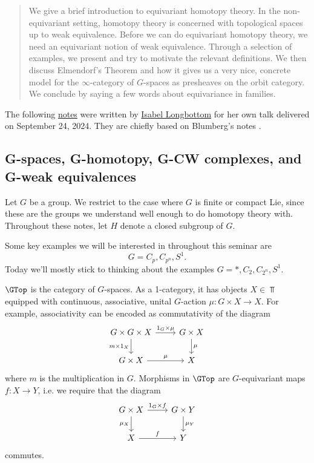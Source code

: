 \begin{abstract}
    We give a brief introduction to equivariant homotopy theory. In the non-equivariant setting, homotopy theory is concerned with topological spaces up to weak equivalence. Before we can do equivariant homotopy theory, we need an equivariant notion of weak equivalence. Through a selection of examples, we present and try to motivate the relevant definitions. We then discuss Elmendorf's Theorem and how it gives us a very nice, concrete model for the $\infty$-category of $G$-spaces as presheaves on the orbit category. We conclude by saying a few words about equivariance in families.
\end{abstract}

The following \href{https://isabel-prime.github.io/files/eqvt-talk.pdf}{notes} were written by \href{https://isabel-prime.github.io/}{Isabel Longbottom} for her own talk delivered on September 24, 2024.
They are chiefly based on Blumberg's notes \cite{burnside}.

\subsection{G-spaces, G-homotopy, G-CW complexes, and G-weak equivalences}

Let $G$ be a group. We restrict to the case where $G$ is finite or compact Lie, since these are the groups we understand well enough to do homotopy theory with. Throughout these notes, let $H$ denote a closed subgroup of $G$. 

Some key examples we will be interested in throughout this seminar are 
\[G = C_p, C_{p^n}, S^1.\] 
Today we'll mostly stick to thinking about the examples $G = *, C_2, C_{2^n}, S^1$. 

\begin{defn}[$G$-spaces] $\GTop$ is the category of $G$-spaces. As a 1-category, it has objects $X \in \Top$ equipped with continuous, associative, unital $G$-action $\mu: G \times X \to X$. For example, associativity can be encoded as commutativity of the diagram
    \[\begin{tikzcd}
        G \times G \times X \arrow[r, "1_G \times \mu"] \arrow[d, "m \times 1_X"'] & G \times X \arrow[d, "\mu"] \\
        G \times X \arrow[r, "\mu"]                                                & X                          
        \end{tikzcd}\] 
    where $m$ is the multiplication in $G$. Morphisms in $\GTop$ are $G$-equivariant maps $f: X \to Y$, i.e. we require that the diagram 
    \[\begin{tikzcd}
        G \times X \arrow[r, "1_G \times f"] \arrow[d, "\mu_X"'] & G \times Y \arrow[d, "\mu_Y"] \\
        X \arrow[r, "f"]                                         & Y                            
        \end{tikzcd}\]
        commutes.
\end{defn}

